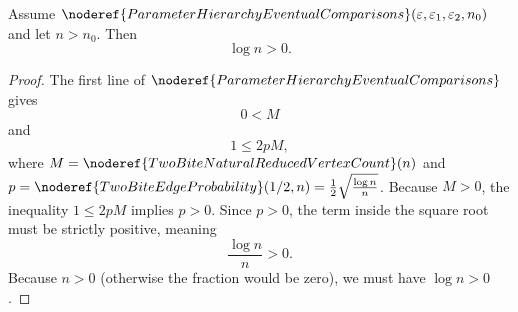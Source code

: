 \begin{helper}
Assume \(\noderef{ParameterHierarchyEventualComparisons}(\varepsilon,\varepsilon_1,\varepsilon_2,n_0)\) and let \(n>n_0\). Then
\[
\log n > 0.
\]
\end{helper}
\begin{proof}
The first line of \(\noderef{ParameterHierarchyEventualComparisons}\) gives
\[
0 < M
\]
and
\[
1 \le 2pM,
\]
where \(M=\noderef{TwoBiteNaturalReducedVertexCount}(n)\) and \(p=\noderef{TwoBiteEdgeProbability}(1/2,n)=\frac{1}{2}\sqrt{\frac{\log n}{n}}\). Because \(M>0\), the inequality \(1 \le 2pM\) implies \(p>0\). Since \(p>0\), the term inside the square root must be strictly positive, meaning
\[
\frac{\log n}{n} > 0.
\]
Because \(n>0\) (otherwise the fraction would be zero), we must have \(\log n > 0\).
\end{proof}
